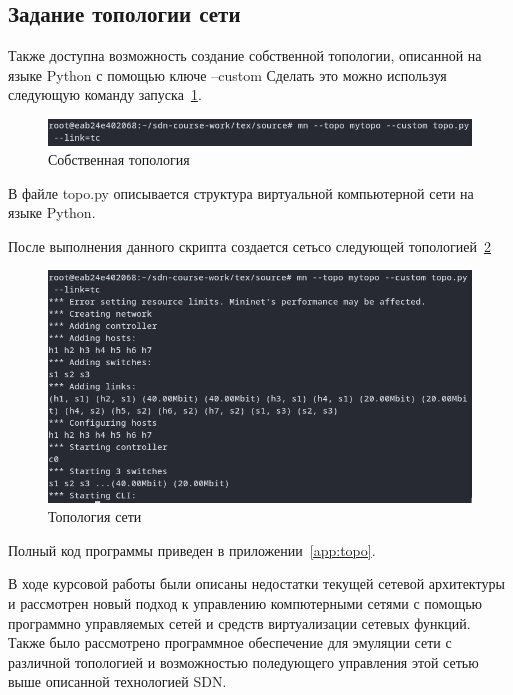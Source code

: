 \documentclass[bachelor, och, coursework]{SCWorks}
\begin{document}
\subsection{Задание топологии сети}\label{topology}
Также доступна возможность создание собственной топологии, описанной на языке Python с помощью ключе --custom
Сделать это можно используя следующую команду запуска~\ref{fig:mn-custom}.
\begin{figure}[H]
    \centering
    \includegraphics[width=\textwidth]{mn-custom}
    \caption{Собственная топология}\label{fig:mn-custom}
\end{figure}
В файле topo.py описывается структура виртуальной компьютерной сети на языке Python.



После выполнения данного скрипта создается сетьсо следующей топологией~\ref{fig:mn-topo}
\begin{figure}[H]
    \centering
    \includegraphics[width=\textwidth]{mn-topo}
    \caption{Топология сети}\label{fig:mn-topo}
\end{figure}

Полный код программы приведен в приложении~\ref{app:topo}.

\conclusion
В ходе курсовой работы были описаны недостатки текущей сетевой архитектуры и рассмотрен новый подход к управлению компютерными сетями с помощью программно управляемых сетей и средств виртуализации сетевых функций. Также было рассмотрено программное обеспечение для эмуляции сети с различной топологией и возможностью поледующего управления этой сетью выше описанной технологией SDN.  
\end{document}

